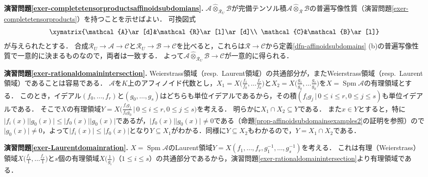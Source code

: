 \documentclass[a4paper,12pt, dvipdfmx]{jsbook}
\def\Spm{\mathop{\mathrm{Spm}}\nolimits}
\newcommand{\abs}[1]{\lvert#1\rvert}
\theoremstyle{plain}
\theoremstyle{definition}
\begin{document}
{\medskip\noindent
{\bf 演習問題\ref{exer-completetensorproductsaffinoidsubdomians}.}
$\mathcal{A}\widehat{\otimes}_{\mathcal{R}_U}\mathcal{B}$が完備テンソル積$\mathcal{A}\widehat{\otimes}_{\mathcal{R}}\mathcal{B}$の普遍写像性質（演習問題\ref{exer-completetensorproducts}）を持つことを示せばよい．
可換図式
$$
\xymatrix{\mathcal{A}\ar[d]&\mathcal{R}\ar[l]\ar[d]\\ \mathcal{C}&\mathcal{B}\ar[l]}
$$
が与えられたとする．
合成$\mathcal{R}_U\rightarrow\mathcal{A}\rightarrow\mathcal{C}$と$\mathcal{R}_U\rightarrow\mathcal{B}\rightarrow\mathcal{C}$を比べると，これらは$\mathcal{R}\rightarrow\mathcal{C}$から定義\ref{dfn-affinoidsubdomains} (b)の普遍写像性質で一意的に決まるものなので，両者は一致する．
よって$\mathcal{A}\widehat{\otimes}_{\mathcal{R}_U}\mathcal{B}\rightarrow\mathcal{C}$が一意的に得られる．

\medskip\noindent
{\bf 演習問題\ref{exer-rationaldomainintersection}.}
Weierstrass領域（resp.\ Laurent領域）の共通部分が，またWeierstrass領域（resp.\ Laurent領域）であることは容易である．
$\mathcal{A}$を$K$上のアフィノイド代数とし，$X_1=X\big({\textstyle \frac{f_1}{f_0},\ldots\frac{f_r}{f_0}}\big)$と$X_2=X\big({\textstyle \frac{g_1}{g_0},\ldots\frac{g_s}{g_0}}\big)$を$X=\Spm\mathcal{A}$の有理領域とする．
このとき，イデアル$(f_0,\ldots,f_r)$と$(g_0,\ldots,g_s)$はどちらも単位イデアルであるから，その積$(f_ig_j\,|\,0\leq i\leq r,0\leq j\leq s)$も単位イデアルである．
そこで$X$の有理領域$Y=X\big({\textstyle \frac{f_ig_j}{f_0g_0}}\,\big|\,0\leq i\leq r,0\leq j\leq s\big)$を考える．
明らかに$X_1\cap X_2\subseteq Y$である．
また$x\in Y$とすると，特に$\abs{f_i(x)}\abs{g_0(x)}\leq\abs{f_0(x)}\abs{g_0(x)}$であるが，$\abs{f_0(x)}\abs{g_0(x)}\neq 0$である（命題\ref{prop-affinoidsubdomainsexamples2}の証明を参照）ので$\abs{g_0(x)}\neq 0$，よって$\abs{f_i(x)}\leq\abs{f_0(x)}$となり$Y\subseteq X_1$がわかる．同様に$Y\subseteq X_2$もわかるので，$Y=X_1\cap X_2$である．

\medskip\noindent
{\bf 演習問題\ref{exer-Laurentdomainration}.}
$X=\Spm\mathcal{A}$のLaurent領域$Y=X(f_1,\ldots,f_r,g^{-1}_1,\ldots,g^{-1}_s)$を考える．
これは有理（Weierstrass）領域$X\big({\textstyle \frac{f_1}{1},\ldots\frac{f_r}{1}}\big)$と$s$個の有理領域$X\big({\textstyle \frac{1}{g_i}}\big)$（$1\leq i\leq s$）の共通部分であるから，演習問題\ref{exer-rationaldomainintersection}より有理領域である．

}
\end{document}
